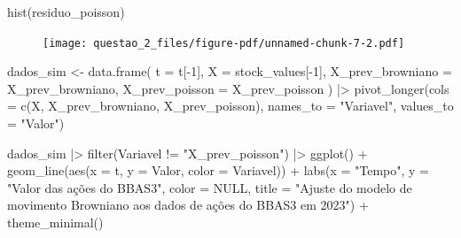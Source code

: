 \documentclass[
  letterpaper,
  DIV=11,
  numbers=noendperiod]{scrreprt}
\newenvironment{Shaded}{\begin{snugshade}}{\end{snugshade}}
\newcommand{\AttributeTok}[1]{\textcolor[rgb]{0.40,0.45,0.13}{#1}}
\newcommand{\ConstantTok}[1]{\textcolor[rgb]{0.56,0.35,0.01}{#1}}
\newcommand{\DecValTok}[1]{\textcolor[rgb]{0.68,0.00,0.00}{#1}}
\newcommand{\FunctionTok}[1]{\textcolor[rgb]{0.28,0.35,0.67}{#1}}
\newcommand{\NormalTok}[1]{\textcolor[rgb]{0.00,0.23,0.31}{#1}}
\newcommand{\OtherTok}[1]{\textcolor[rgb]{0.00,0.23,0.31}{#1}}
\newcommand{\SpecialCharTok}[1]{\textcolor[rgb]{0.37,0.37,0.37}{#1}}
\newcommand{\StringTok}[1]{\textcolor[rgb]{0.13,0.47,0.30}{#1}}
\begin{document}
\begin{Shaded}
\begin{Highlighting}[]
\FunctionTok{hist}\NormalTok{(residuo\_poisson)}
\end{Highlighting}
\end{Shaded}

\begin{figure}[H]

{\centering \texttt{[image: questao\_2\_files/figure-pdf/unnamed-chunk-7-2.pdf]}

}

\end{figure}

\begin{Shaded}
\begin{Highlighting}[]
\NormalTok{dados\_sim }\OtherTok{\textless{}{-}} \FunctionTok{data.frame}\NormalTok{(}
    \AttributeTok{t =}\NormalTok{ t[}\SpecialCharTok{{-}}\DecValTok{1}\NormalTok{],}
    \AttributeTok{X =}\NormalTok{ stock\_values[}\SpecialCharTok{{-}}\DecValTok{1}\NormalTok{],}
    \AttributeTok{X\_prev\_browniano =}\NormalTok{ X\_prev\_browniano,}
    \AttributeTok{X\_prev\_poisson =}\NormalTok{ X\_prev\_poisson}
\NormalTok{) }\SpecialCharTok{|\textgreater{}} 
\FunctionTok{pivot\_longer}\NormalTok{(}\AttributeTok{cols =} \FunctionTok{c}\NormalTok{(X, X\_prev\_browniano, X\_prev\_poisson),}
             \AttributeTok{names\_to =} \StringTok{"Variavel"}\NormalTok{,}
             \AttributeTok{values\_to =} \StringTok{"Valor"}\NormalTok{) }
\end{Highlighting}
\end{Shaded}

\begin{Shaded}
\begin{Highlighting}[]
\NormalTok{dados\_sim }\SpecialCharTok{|\textgreater{}} 
    \FunctionTok{filter}\NormalTok{(Variavel }\SpecialCharTok{!=} \StringTok{"X\_prev\_poisson"}\NormalTok{) }\SpecialCharTok{|\textgreater{}} 
    \FunctionTok{ggplot}\NormalTok{() }\SpecialCharTok{+}
    \FunctionTok{geom\_line}\NormalTok{(}\FunctionTok{aes}\NormalTok{(}\AttributeTok{x =}\NormalTok{ t, }\AttributeTok{y =}\NormalTok{ Valor, }\AttributeTok{color =}\NormalTok{ Variavel)) }\SpecialCharTok{+}
    \FunctionTok{labs}\NormalTok{(}\AttributeTok{x =} \StringTok{"Tempo"}\NormalTok{,}
         \AttributeTok{y =} \StringTok{"Valor das ações do BBAS3"}\NormalTok{,}
         \AttributeTok{color =} \ConstantTok{NULL}\NormalTok{,}
         \AttributeTok{title =} \StringTok{"Ajuste do modelo de movimento Browniano}
\StringTok{          aos dados de ações do BBAS3 em 2023"}\NormalTok{) }\SpecialCharTok{+}
    \FunctionTok{theme\_minimal}\NormalTok{()}
\end{Highlighting}
\end{Shaded}
\end{document}
